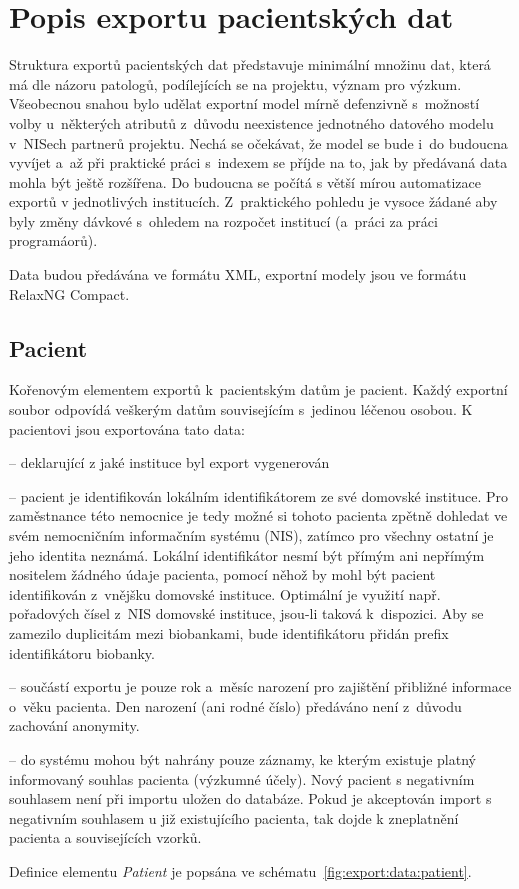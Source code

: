 \section{Popis exportu pacientských dat}
Struktura exportů pacientských dat představuje minimální množinu dat, která má dle názoru patologů, podílejících se na projektu, význam pro výzkum. Všeobecnou snahou bylo udělat exportní model mírně defenzivně s~možností volby u~některých atributů z~důvodu neexistence jednotného datového modelu v~NISech partnerů projektu. Nechá se očekávat, že model se bude i~do budoucna vyvíjet a~až při praktické práci s~indexem se příjde na to, jak by předávaná data mohla být ještě rozšířena. 
Do budoucna se počítá s větší mírou automatizace exportů v jednotlivých institucích.
Z~praktického pohledu je vysoce žádané aby byly změny dávkové s~ohledem na rozpočet institucí (a~práci za práci programáorů).

Data budou předávána ve formátu XML, exportní modely jsou ve formátu RelaxNG Compact.

\subsection{Pacient}
Kořenovým elementem exportů k~pacientským datům je pacient. Každý exportní soubor odpovídá veškerým datům souvisejícím s~jedinou léčenou osobou. K pacientovi jsou exportována tato data: 

\begin{itemize}
		 -- deklarující z jaké instituce byl export vygenerován

		 -- pacient je identifikován lokálním identifikátorem ze své domovské instituce. Pro zaměstnance této nemocnice je tedy možné si tohoto pacienta zpětně dohledat ve svém nemocničním informačním systému (NIS), zatímco pro všechny ostatní je jeho identita neznámá. Lokální identifikátor nesmí být přímým ani nepřímým nositelem žádného údaje pacienta, pomocí něhož by mohl být pacient identifikován z~vnějšku domovské instituce. Optimální je využití např. pořadových čísel z~NIS domovské instituce, jsou-li taková k~dispozici. Aby se zamezilo duplicitám mezi biobankami, bude identifikátoru přidán prefix identifikátoru biobanky.
		
		 -- součástí exportu je pouze rok a~měsíc narození pro zajištění přibližné informace o~věku pacienta. Den narození (ani rodné číslo) předáváno není z~důvodu zachování anonymity.
		
		 -- do systému mohou být nahrány pouze záznamy, ke kterým existuje platný informovaný souhlas pacienta (výzkumné účely). Nový pacient s negativním souhlasem není při importu uložen do databáze. Pokud je akceptován import s negativním souhlasem u již existujícího pacienta, tak dojde k zneplatnění pacienta a souvisejících vzorků.
		
		
	\end{itemize}
Definice elementu \textit{Patient} je popsána ve schématu~\ref{fig:export:data:patient}.

